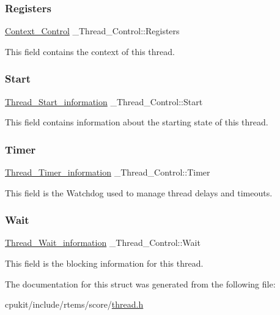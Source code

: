 \subsubsection{\texorpdfstring{Registers}{Registers}}
{\footnotesize\ttfamily \mbox{\hyperlink{structContext__Control}{Context\+\_\+\+Control}} \+\_\+\+Thread\+\_\+\+Control\+::\+Registers}

This field contains the context of this thread. \mbox{\label{struct__Thread__Control_ad4d5481a7e253ea6411977404341784a}} 
\subsubsection{\texorpdfstring{Start}{Start}}
{\footnotesize\ttfamily \mbox{\hyperlink{structThread__Start__information}{Thread\+\_\+\+Start\+\_\+information}} \+\_\+\+Thread\+\_\+\+Control\+::\+Start}

This field contains information about the starting state of this thread. \mbox{\label{struct__Thread__Control_a920463ad1e3de6c9fefbd66e686c4248}} 
\subsubsection{\texorpdfstring{Timer}{Timer}}
{\footnotesize\ttfamily \mbox{\hyperlink{structThread__Timer__information}{Thread\+\_\+\+Timer\+\_\+information}} \+\_\+\+Thread\+\_\+\+Control\+::\+Timer}

This field is the Watchdog used to manage thread delays and timeouts. \mbox{\label{struct__Thread__Control_a385c5168e2ba27f7afae4afb3f3d0216}} 
\subsubsection{\texorpdfstring{Wait}{Wait}}
{\footnotesize\ttfamily \mbox{\hyperlink{structThread__Wait__information}{Thread\+\_\+\+Wait\+\_\+information}} \+\_\+\+Thread\+\_\+\+Control\+::\+Wait}

This field is the blocking information for this thread. 

The documentation for this struct was generated from the following file\+:\begin{DoxyCompactItemize}
\item 
cpukit/include/rtems/score/\mbox{\hyperlink{score_2thread_8h}{thread.\+h}}\end{DoxyCompactItemize}
